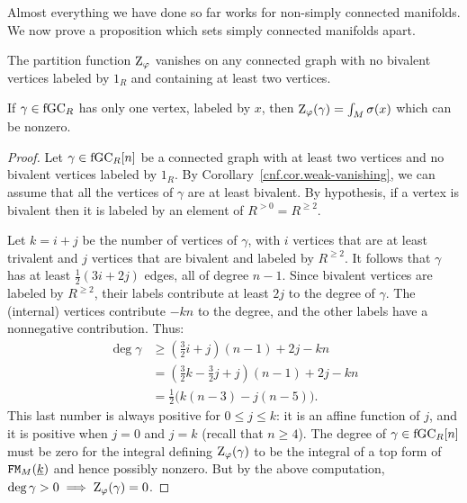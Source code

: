 Almost everything we have done so far works for non-simply connected manifolds.
We now prove a proposition which sets simply connected manifolds apart.

\begin{proposition}
  \label{cnf.prop.strong-vanishing}
  The partition function $\mathrm{Z}_{\varphi}$ vanishes on any connected graph with no bivalent vertices labeled by $1_{R}$ and containing at least two vertices.
\end{proposition}

\begin{remark}
  If $\gamma \in \mathrm{fGC}_{R}$ has only one vertex, labeled by $x$, then $\mathrm{Z}_{\varphi}(\gamma) = \int_{M} \sigma(x)$ which can be nonzero.
\end{remark}

\begin{proof}
  Let $\gamma \in \mathrm{fGC}_{R}[n]$ be a connected graph with at least two vertices and no bivalent vertices labeled by $1_{R}$.
  By Corollary~\ref{cnf.cor.weak-vanishing}, we can assume that all the vertices of $\gamma$ are at least bivalent.
  By hypothesis, if a vertex is bivalent then it is labeled by an element of $R^{> 0} = R^{\geq 2}$.

  Let $k = i + j$ be the number of vertices of $\gamma$, with $i$ vertices that are at least trivalent and $j$ vertices that are bivalent and labeled by $R^{\geq 2}$.
  It follows that $\gamma$ has at least $\frac{1}{2} (3i + 2j)$ edges, all of degree $n-1$.
  Since bivalent vertices are labeled by $R^{\geq 2}$, their labels contribute at least $2j$ to the degree of $\gamma$.
  The (internal) vertices contribute $-kn$ to the degree, and the other labels have a nonnegative contribution.
  Thus:
  \begin{align*}
    \deg \gamma
    & \geq \left( \frac{3}{2} i + j \right) (n-1) + 2j - kn \\
    & = \left( \frac{3}{2} k - \frac{3}{2}j + j \right) (n-1) + 2j - kn \\
    & = \frac{1}{2} \bigl( k (n-3) - j (n-5) \bigr).
  \end{align*}
  This last number is always positive for $0 \leq j \leq k$: it is an affine function of $j$, and it is positive when $j = 0$ and $j = k$ (recall that $n \geq 4$).
  The degree of $\gamma \in \mathrm{fGC}_{R}[n]$ must be zero for the integral defining $\mathrm{Z}_{\varphi}(\gamma)$ to be the integral of a top form of $\mathtt{FM}_{M}(\underline{k})$ and hence possibly nonzero.
  But by the above computation, $\deg \gamma > 0 \implies \mathrm{Z}_{\varphi}(\gamma) = 0$.
 \end{proof}

